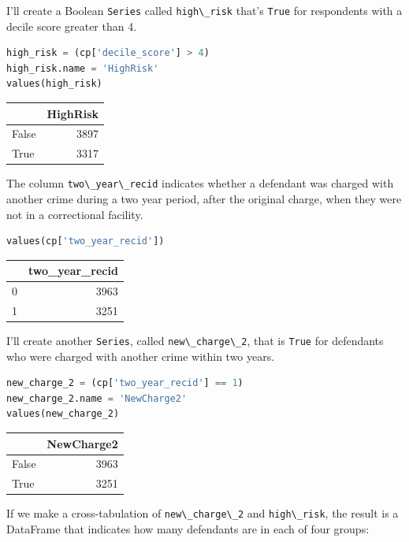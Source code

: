 I'll create a Boolean \passthrough{\lstinline!Series!} called
\passthrough{\lstinline!high\_risk!} that's
\passthrough{\lstinline!True!} for respondents with a decile score
greater than 4.

\begin{lstlisting}[language=Python]
high_risk = (cp['decile_score'] > 4)
high_risk.name = 'HighRisk'
values(high_risk)
\end{lstlisting}

\begin{tabular}{lr}
\toprule
{} &  HighRisk \\
\midrule
False &      3897 \\
True  &      3317 \\
\bottomrule
\end{tabular}

The column \passthrough{\lstinline!two\_year\_recid!} indicates whether
a defendant was charged with another crime during a two year period,
after the original charge, when they were not in a correctional
facility.

\begin{lstlisting}[language=Python]
values(cp['two_year_recid'])
\end{lstlisting}

\begin{tabular}{lr}
\toprule
{} &  two\_year\_recid \\
\midrule
0 &            3963 \\
1 &            3251 \\
\bottomrule
\end{tabular}

I'll create another \passthrough{\lstinline!Series!}, called
\passthrough{\lstinline!new\_charge\_2!}, that is
\passthrough{\lstinline!True!} for defendants who were charged with
another crime within two years.

\begin{lstlisting}[language=Python]
new_charge_2 = (cp['two_year_recid'] == 1)
new_charge_2.name = 'NewCharge2'
values(new_charge_2)
\end{lstlisting}

\begin{tabular}{lr}
\toprule
{} &  NewCharge2 \\
\midrule
False &        3963 \\
True  &        3251 \\
\bottomrule
\end{tabular}

If we make a cross-tabulation of
\passthrough{\lstinline!new\_charge\_2!} and
\passthrough{\lstinline!high\_risk!}, the result is a DataFrame that
indicates how many defendants are in each of four groups:

